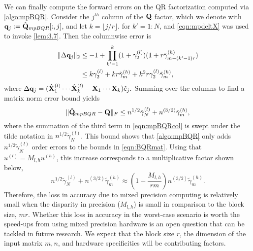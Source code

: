 We can finally compute the forward errors on the QR factorization computed via \cref{algo:mpBQR}.
Consider the $j^{th}$ column of the $\mathbf{Q}$ factor, which we denote with $\mathbf{q}_j:=\hat{\mathbf{Q}}_{mpBQR}[:,j]$, and let $k = \lfloor j/r\rfloor$.
for $k'=1:N$, and \cref{eqn:mpdeltX} was used to invoke \cref{lem:3.7}.
Then the columnwise error is 
\begin{align}
	\|\Delta \bb{q}_j \|_2 &\leq -1 + \prod_{k'=1}^k (1+\gamma_2^{(l)})(1+r\tilde{\gamma}_{m-(k'-1)r}^{(h)})\\ 
	&\leq k\gamma_{2}^{(l)} + kr\tilde{\gamma}_m^{(h)} + k^2r\gamma_{2}^{(l)}\tilde{\gamma}_m^{(h)}, \label{eqn:mpBQRcol}
\end{align} 
where $\Delta \mathbf{q}_j = (\hat{\mathbf{X}}_1^{(l)}\cdots\hat{\mathbf{X}}_k^{(l)} - \mathbf{X}_1\cdots\mathbf{X}_k )\hat{e}_j.$
Summing over the columns to find a matrix norm error bound yields
\begin{equation}
	\|\hat{\mathbf{Q}}_{mpBQR}-\mathbf{Q}\|_F \leq n^{1/2}\tilde{\gamma}_{N}^{(l)} + n^{(3/2)}\tilde{\gamma}_m^{(h)},
\end{equation}
where the summation of the third term in \cref{eqn:mpBQRcol} is swept under the tilde notation in $n^{1/2} \tilde{\gamma}_{N}^{(l)}$.
This bound shows that \cref{algo:mpBQR} only adds $n^{1/2}\tilde{\gamma}_{N}^{(l)}$ order errors to the bounds in \cref{eqn:BQRmat}.
Using that $u^{(l)}=M_{l,h}u^{(h)}$, this increase corresponds to a multiplicative factor shown below,
\begin{equation}
	n^{1/2}\tilde{\gamma}_{N}^{(l)} + n^{(3/2)}\tilde{\gamma}_m^{(h)} \approx \left(1+\frac{M_{l,h}}{rm}\right)n^{(3/2)}\tilde{\gamma}_m^{(h)}.
\end{equation}
Therefore, the loss in accuracy due to mixed precision computing is relatively small when the disparity in precision ($M_{l,h}$) is small in comparison to the block size, $mr$.
Whether this loss in accuracy in the worst-case scenario is worth the speed-ups from using mixed precision hardware is an open question that can be tackled in future research.
We expect that the block size $r$, the dimension of the input matrix $m,n$, and hardware specificities will be contributing factors. 
